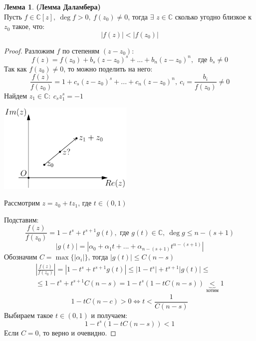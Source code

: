 \documentclass[a4paper, 12pt]{article}
\newcounter{lemcount}
\newcounter{lemcount2}
\theoremstyle{definition}
\newtheorem{lemmanum}[lemcount]{Лемма}
\begin{document}
  \begin{lemmanum}\textbf{(Лемма Даламбера)} \\
    Пусть $f \in \mathbb{C}[z], \ \deg f >0, \ f(z_0) \neq 0$, тогда $\exists$ $z \in \mathbb{C}$ сколько угодно близкое  к $z_0$ такое, что:
    $$|f(z)|< |f(z_0)|$$ 
  \end{lemmanum} 
  \begin{proof}
    Разложим $f$ по степеням $(z-z_0)$:
    $$f(z) = f(z_0) + b_s(z-z_0)^s + ... + b_n(z-z_0)^n, \ \text{ где } b_s \neq 0$$
    Так как $f(z_0) \neq 0$, то можно поделить на него:
    $$\frac{f(z)}{f(z_0)} = 1 + c_s(z-z_0)^s + ... + c_n(z-z_0)^n, \ c_i = \frac{b_i}{f(z_0)} \neq 0$$  
    Найдем $z_1 \in \mathbb{C}: \ c_sz_1^s = -1$
    \begin{center}
      \includegraphics[width=6.5cm]{image/lecture-22.pdf}
    \end{center}

    \begin{center}
      Рассмотрим $z = z_0 + tz_1$, где $t \in (0,1)$
    \end{center}
    Подставим: 
    $$\frac{f(z)}{f(z_0)} = 1 - t^s + t^{s+1} g(t), \text{ где } g(t) \in \mathbb{C}, \ \deg g \leq n-(s+1)$$
    $$|g(t)| = |\alpha_0 + \alpha_1t + ... + \alpha_{n-(s+1)}t^{n-(s+1)}|$$ 
    Обозначим $C = \max\{|\alpha_i|\}$, тогда $|g(t)|\leq C(n-s)$
    \begin{multline*}
      \left|\frac{f(z)}{f(z_0)}\right| = |1 - t^s + t^{s+1} g(t)| \leq |1 - t^s| + t^{s+1} |g(t)| \leq \\ \leq 1 - t^s + t^{s+1} C(n-s) = 1 - t^s(1-tC(n-s)) \underbrace{<}_{\text{хотим}} 1
    \end{multline*} 
     $$1-tC(n-c)>0 \Longleftrightarrow t<\frac{1}{C(n-s)}$$
     Выбираем такое $t \in (0,1)$ и получаем:
     $$1-t^s(1-tC(n-s)) < 1$$
     Если $C=0$, то верно и очевидно.   
  \end{proof}
\end{document}
